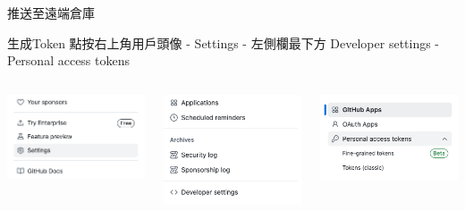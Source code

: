 \documentclass[xetex, unicode, 10pt, aspectratio=169]{beamer}
\begin{document}
\begin{frame}{推送至遠端倉庫}
    \begin{block}{生成Token}
        點按右上角用戶頭像 - Settings - 左側欄最下方 Developer settings - Personal access tokens

        \begin{columns}
            \begin{column}{0.3\textwidth}
                \begin{center}
                    \includegraphics[width=1.9in]{./img/github-add-key-0.png}
                \end{center}
            \end{column}

            \begin{column}{0.3\textwidth}
                \begin{center}
                    \includegraphics[width=1.9in]{./img/github-add-key-1.png}
                \end{center}
            \end{column}

            \begin{column}{0.3\textwidth}
                \begin{center}
                    \includegraphics[width=1.9in]{./img/github-add-key-2.png}
                \end{center}
            \end{column}
        \end{columns}
    \end{block}
\end{frame}
\end{document}
